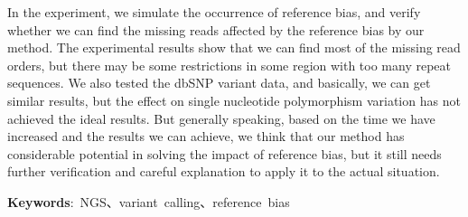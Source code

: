 In the experiment, we simulate the occurrence of reference bias, and verify whether we can find the missing reads affected by the reference bias by our method. The experimental results show that we can find most of the missing read orders, but there may be some restrictions in some region with too many repeat sequences. We also tested the dbSNP variant data, and basically, we can get similar results, but the effect on single nucleotide polymorphism variation has not achieved the ideal results. But generally speaking, based on the time we have increased and the results we can achieve, we think that our method has considerable potential in solving the impact of reference bias, but it still needs further verification and careful explanation to apply it to the actual situation.


\begin{flushleft}
\mbox{{\bf Keywords}:  NGS、variant calling、reference bias }
\end{flushleft}